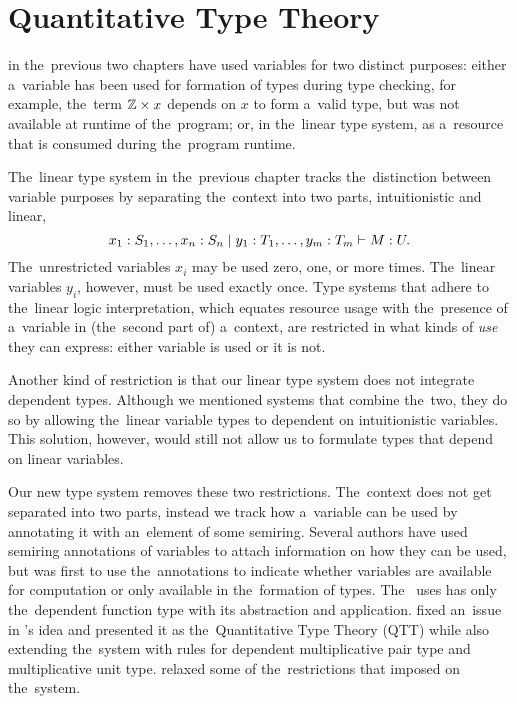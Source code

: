\chapter{Quantitative Type Theory}\label{cha:qtt}

 in the~previous two chapters have used
variables for two distinct purposes: either a~variable has been used for
formation of types during type checking, for example, the~term $\mathbb{Z} \times x$
depends on $x$ to form a~valid type, but was not available at runtime of
the~program; or, in the~linear type system, as a~resource that is consumed
during the~program runtime.

The~linear type system in the~previous chapter tracks the~distinction between
variable purposes by separating the~context into two parts, intuitionistic and
linear,
\[
  x_1 \overset{}: S_1, \dotsc, x_n \overset{}: S_n \mid y_1 \overset{}: T_1, \dotsc, y_m \overset{}: T_m
    \vdash M \overset{}: U.
\]
The~unrestricted variables $x_i$ may be used zero, one, or more times.
The~linear variables $y_i$, however, must be used exactly once. Type systems
that adhere to the~linear logic interpretation, which equates resource usage
with the~presence of a~variable in (the~second part of) a~context, are
restricted in what kinds of \emph{use} they can express: either variable is used
or it is not.

Another kind of restriction is that our linear type system does not integrate
dependent types. Although we mentioned systems that combine the~two, they do so
by allowing the~linear variable types to dependent on intuitionistic variables.
This solution, however, would still not allow us to formulate types that depend
on linear variables.

Our new type system removes these two restrictions. The~context does not get
separated into two parts, instead we track how a~variable can be used by
annotating it with an~element of some semiring. Several authors have used
semiring annotations of variables to attach information on how they can be used,
but \citet{mcbride_2016} was first to use the~annotations to indicate
whether variables are available for computation or only available in
the~formation of types. The~\lc \citeauthor{mcbride_2016} uses has only
the~dependent function type with its abstraction and application.
\citet{atkey_2018} fixed an~issue in \citeauthor{mcbride_2016}'s idea and
presented it as the~Quantitative Type Theory (QTT) while also extending
the~system with rules for dependent multiplicative pair type and multiplicative
unit type. \citet{weirich_2020} relaxed some of the~restrictions that
\citeauthor{atkey_2018} imposed on the~system.

